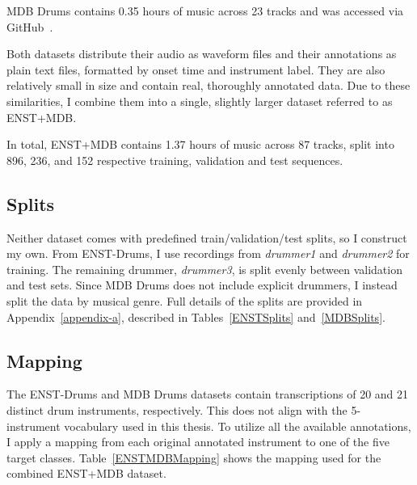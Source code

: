 MDB Drums contains 0.35 hours of music across 23 tracks and was accessed via GitHub~\cite{southall_mdbdrums_2017}.

Both datasets distribute their audio as waveform files and their annotations as plain text files, formatted by onset time and instrument label. They are also relatively small in size and contain real, thoroughly annotated data. Due to these similarities, I combine them into a single, slightly larger dataset referred to as ENST+MDB.

In total, ENST+MDB contains 1.37 hours of music across 87 tracks, split into 896, 236, and 152 respective training, validation and test sequences.

\subsection{Splits}

Neither dataset comes with predefined train/validation/test splits, so I construct my own. From ENST-Drums, I use recordings from \textit{drummer1} and \textit{drummer2} for training. The remaining drummer, \textit{drummer3}, is split evenly between validation and test sets. Since MDB Drums does not include explicit drummers, I instead split the data by musical genre. Full details of the splits are provided in Appendix~\ref{appendix-a}, described in Tables~\ref{ENSTSplits} and~\ref{MDBSplits}.

\subsection{Mapping}

The ENST-Drums and MDB Drums datasets contain transcriptions of 20 and 21 distinct drum instruments, respectively. This does not align with the 5-instrument vocabulary used in this thesis. To utilize all the available annotations, I apply a mapping from each original annotated instrument to one of the five target classes. Table~\ref{ENSTMDBMapping} shows the mapping used for the combined ENST+MDB dataset.

